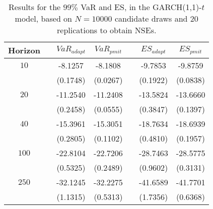 \begin{table}[h] 
\centering 
\caption{Results for the $99\%$ VaR and ES, in the GARCH(1,1)-$t$ model, based on $N=10000$ candidate draws and $20$ replications to obtain NSEs.} 
\label{tab:res_pmit_t_garch2_noS} 
\begin{tabular}{ccccccc}  
 Horizon & & $VaR_{adapt}$ & $VaR_{pmit}$ & & $ES_{adapt}$ & $ES_{pmit}$ \\ \hline 
$10$ & & -8.1257 & -8.1808 & & -9.7853 & -9.8759  \\ 
 & & (0.1748) & (0.0267) & & (0.1922) & (0.0838)   \\ [1ex] 
$20$ & & -11.2540 & -11.2408 & & -13.5824 & -13.6660  \\ 
 & & (0.2458) & (0.0555) & & (0.3847) & (0.1397)   \\ [1ex] 
$40$ & & -15.3961 & -15.3051 & & -18.7634 & -18.6939  \\ 
 & & (0.2805) & (0.1102) & & (0.4810) & (0.1957)   \\ [1ex] 
$100$ & & -22.8104 & -22.7206 & & -28.7463 & -28.5775  \\ 
 & & (0.5325) & (0.2489) & & (0.9602) & (0.3131)   \\ [1ex] 
$250$ & & -32.1245 & -32.2275 & & -41.6589 & -41.7701  \\ 
 & & (1.1315) & (0.5313) & & (1.7356) & (0.6368)   \\ [1ex] 
\hline 
\end{tabular} 
\end{table} 

